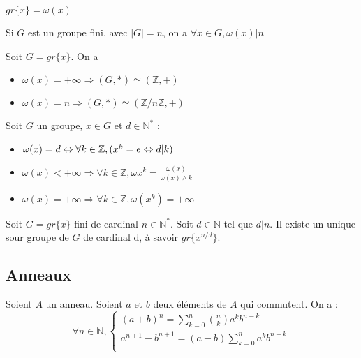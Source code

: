 \begin{prop} $gr\{x\} = \omega(x)$ \end{prop}

\begin{prop} Si $G$ est un groupe fini, avec $|G| = n$, on a $\forall x \in G, \omega(x) | n$ \end{prop}

\begin{prop} Soit $G = gr\{x\}$. On a \begin{itemize}
    \item $\omega(x) = +\infty \Rightarrow (G,*)\simeq(\mathbb{Z},+)$
    \item $\omega(x) = n \Rightarrow (G,*)\simeq(\mathbb{Z}/n\mathbb{Z},+)$
\end{itemize}\end{prop}

\begin{prop} Soit $G$ un groupe, $x\in G$ et $d\in\mathbb{N}^*$ :\begin{itemize}
    \item $\omega(x) = d \Leftrightarrow \forall k \in \mathbb{Z}, (x^k=e\Leftrightarrow d|k)$
    \item $\omega(x) < +\infty \Rightarrow \forall k \in \mathbb{Z}, \omega{x^k} = \frac{\omega(x)}{\omega(x)\wedge k}$
    \item $\omega(x) = +\infty \Rightarrow \forall k \in \mathbb{Z}, \omega(x^k) = +\infty$
\end{itemize}\end{prop}

\begin{prop} Soit $G=gr\{x\}$ fini de cardinal $n\in\mathbb{N}^*$. Soit $d\in\mathbb{N}$ tel que $d|n$. Il existe un unique sour groupe de $G$ de cardinal d, à savoir $gr\{x^{n/d}\}$.
\end{prop}

\subsection{Anneaux}
\begin{lemme} Soient $A$ un anneau. Soient $a$ et $b$ deux éléments de $A$ qui commutent. On a :\[\forall n \in \mathbb{N},\left\{\begin{array}{l}
            (a+b)^n = \sum_{k=0}^n {n\choose k} a^kb^{n-k} \\
            a^{n+1}-b^{n+1} = (a-b)\sum_{k=0}^n a^kb^{n-k} \\
\end{array}\right.\]\end{lemme}

